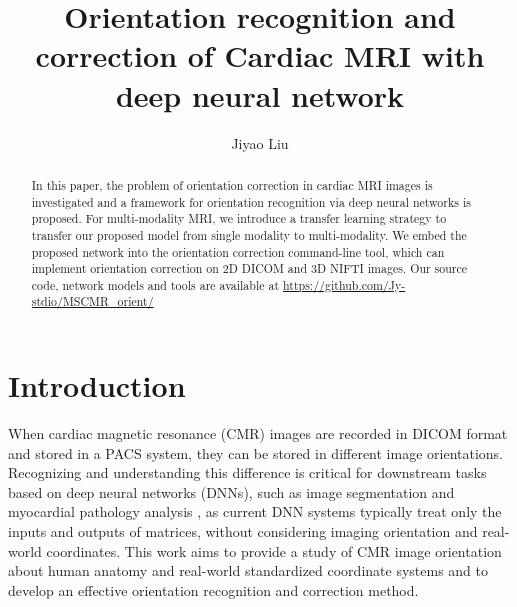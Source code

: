 \documentclass[runningheads]{llncs}
\begin{document}
%
\title{Orientation recognition and correction of Cardiac MRI with deep neural network}
%
%

\author{Jiyao Liu 
}
%

%
\maketitle              %
%

\begin{abstract}

In this paper, the problem of orientation correction in cardiac MRI images is investigated and a framework for orientation recognition via deep neural networks is proposed. For  multi-modality MRI, we introduce a transfer learning strategy to transfer our proposed model from single modality to multi-modality. We embed the proposed network into the orientation correction command-line tool, which can implement orientation correction on 2D DICOM and 3D NIFTI images. Our source code, network models and tools are available at \url{https://github.com/Jy-stdio/MSCMR\_orient/}


\end{abstract}
%
%
%
\section{Introduction}

When cardiac magnetic resonance (CMR) images are recorded in DICOM format and stored in a PACS system, they can be stored in different image orientations. Recognizing and understanding this difference is critical for downstream tasks based on deep neural networks (DNNs), such as image segmentation \cite{seg1} and myocardial pathology analysis \cite{anas1}, as current DNN systems typically treat only the inputs and outputs of matrices, without considering imaging orientation and real-world coordinates. This work aims to provide a study of CMR image orientation 
about human anatomy and real-world standardized coordinate systems and to develop an effective orientation recognition and correction method.
\end{document}
